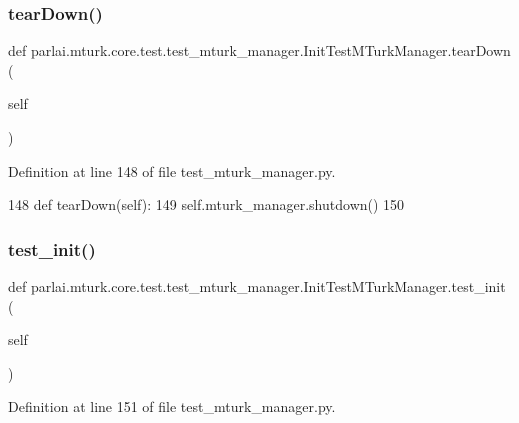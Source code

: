 \subsubsection{\texorpdfstring{tear\+Down()}{tearDown()}}
{\footnotesize\ttfamily def parlai.\+mturk.\+core.\+test.\+test\+\_\+mturk\+\_\+manager.\+Init\+Test\+M\+Turk\+Manager.\+tear\+Down (\begin{DoxyParamCaption}\item[{}]{self }\end{DoxyParamCaption})}



Definition at line 148 of file test\+\_\+mturk\+\_\+manager.\+py.


\begin{DoxyCode}
148     \textcolor{keyword}{def }tearDown(self):
149         self.mturk\_manager.shutdown()
150 
\end{DoxyCode}
\mbox{\label{classparlai_1_1mturk_1_1core_1_1test_1_1test__mturk__manager_1_1InitTestMTurkManager_ac038f59a9e49e1378a6fa37c418c6317}} 
\subsubsection{\texorpdfstring{test\+\_\+init()}{test\_init()}}
{\footnotesize\ttfamily def parlai.\+mturk.\+core.\+test.\+test\+\_\+mturk\+\_\+manager.\+Init\+Test\+M\+Turk\+Manager.\+test\+\_\+init (\begin{DoxyParamCaption}\item[{}]{self }\end{DoxyParamCaption})}



Definition at line 151 of file test\+\_\+mturk\+\_\+manager.\+py.


